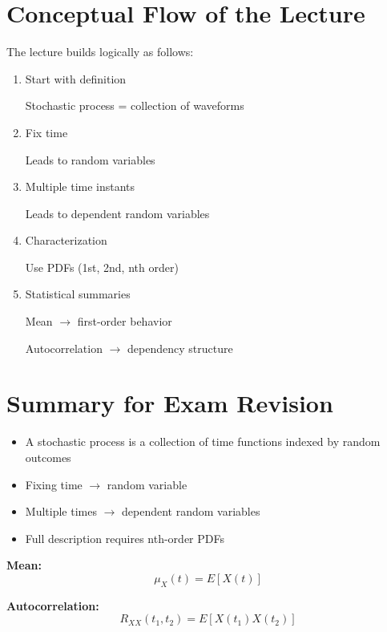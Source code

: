 \documentclass[12pt]{article}
\begin{document}
\section{Conceptual Flow of the Lecture}

The lecture builds logically as follows:
\begin{enumerate}
    \item Start with definition  

    Stochastic process = collection of waveforms

    \item Fix time  

    Leads to random variables

    \item Multiple time instants  

    Leads to dependent random variables

    \item Characterization  

    Use PDFs (1st, 2nd, nth order)

    \item Statistical summaries  

    Mean $\rightarrow$ first-order behavior  

    Autocorrelation $\rightarrow$ dependency structure
\end{enumerate}

\section{Summary for Exam Revision}

\begin{itemize}
    \item A stochastic process is a collection of time functions indexed by random outcomes
    \item Fixing time $\rightarrow$ random variable
    \item Multiple times $\rightarrow$ dependent random variables
    \item Full description requires nth-order PDFs
\end{itemize}

\textbf{Mean:}
\[
\mu_X(t) = E[X(t)]
\]

\textbf{Autocorrelation:}
\[
R_{XX}(t_1, t_2) = E[X(t_1)X(t_2)]
\]
\end{document}
